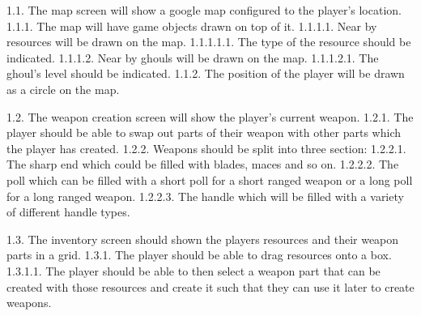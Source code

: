 \documentclass{article}
\newcommand{\forceindent}{\leavevmode{\parindent=1em\indent}}
\begin{document}
		\forceindent 1.1. The map screen will show a google map configured to the player's location.\newline
		\forceindent \forceindent 1.1.1. The map will have game objects drawn on top of it. \newline
		\forceindent \forceindent \forceindent 1.1.1.1. Near by resources will be drawn on the map.\newline
		\forceindent \forceindent \forceindent \forceindent 1.1.1.1.1. The type of the resource should be indicated.\newline
		\forceindent \forceindent \forceindent 1.1.1.2. Near by ghouls will be drawn on the map.\newline
		\forceindent \forceindent \forceindent \forceindent 1.1.1.2.1. The ghoul's level should be indicated.\newline
		\forceindent \forceindent 1.1.2. The position of the player will be drawn as a circle on the map.\newline
		
		\forceindent 1.2. The weapon creation screen will show the player's current weapon.\newline
		\forceindent \forceindent 1.2.1. The player should be able to swap out parts of their weapon with other parts which the player has created.\newline
		\forceindent \forceindent 1.2.2. Weapons should be split into three section:\newline
		\forceindent \forceindent \forceindent 1.2.2.1. The sharp end which could be filled with blades, maces and so on.\newline
		\forceindent \forceindent \forceindent 1.2.2.2. The poll which can be filled with a short poll for a short ranged weapon or a long poll for a long ranged weapon.\newline
		\forceindent \forceindent \forceindent 1.2.2.3. The handle which will be filled with a variety of different handle types. \newline
		
		\forceindent 1.3. The inventory screen should shown the players resources and their weapon parts in a grid.\newline
		\forceindent \forceindent 1.3.1. The player should be able to drag resources onto a box. \newline
		\forceindent \forceindent 1.3.1.1. The player should be able to then select a weapon part that can be created with those resources and create it such that they can use it later to create weapons. \newline
		
\end{document}
